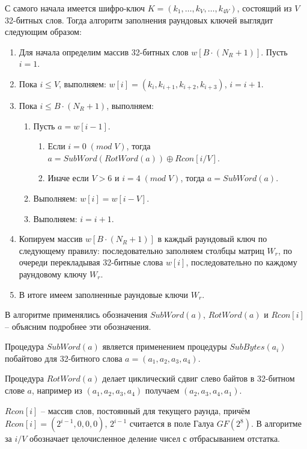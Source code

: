    С самого начала имеется шифро-ключ $K = (k_1, \dots, k_{V}, \dots, k_{4V})$, состоящий из $V$ 32-битных слов.
    Тогда алгоритм заполнения раундовых ключей выглядит следующим образом:
    \begin{enumerate}
        \item Для начала определим массив 32-битных слов $w[B \cdot (N_R + 1)]$. Пусть $i = 1$.
        \item Пока $i \leq V$, выполняем: $w[i] = (k_{i}, k_{i + 1}, k_{i + 2}, k_{i + 3})$, $i = i + 1$.
        \item Пока $i \leq B \cdot (N_R + 1)$, выполняем:
        \begin{enumerate}
            \item Пусть $a = w[i - 1]$.

            \begin{enumerate}
                \item Если $i = 0 \; (mod \; V)$, тогда $a = SubWord(RotWord(a)) \oplus Rcon[i / V]$.
                \item Иначе если $V > 6$ и $i = 4 \; (mod \; V)$, тогда $a = SubWord(a)$.
            \end{enumerate}

            \item Выполняем: $w[i] = w[i - V]$.
            \item Выполняем: $i = i + 1$.
        \end{enumerate}

        \item Копируем массив $w[B \cdot (N_R + 1)]$ в каждый раундовый ключ по следующему правилу: последовательно
        заполняем столбцы матриц $W_r$, по очереди перекладывая 32-битные слова $w[i]$, последовательно по каждому
        раундовому ключу $W_r$.
        \item В итоге имеем заполненные раундовые ключи $W_r$.
    \end{enumerate}

    В алгоритме применялись обозначения $SubWord(a)$, $RotWord(a)$ и $Rcon[i]$ -- объясним подробнее эти обозначения.

    Процедура $SubWord(a)$ является применением процедуры $SubBytes(a_{i})$ побайтово для 32-битного слова
    $a = (a_1, a_2, a_3, a_4)$.

    Процедура $RotWord(a)$ делает циклический сдвиг слево байтов в 32-битном слове $a$, например из $(a_1, a_2, a_3, a_4)$
    получаем $(a_2, a_3, a_4, a_1)$.

    $Rcon[i]$ -- массив слов, постоянный для текущего раунда, причём $Rcon[i] = (2^{i-1}, 0, 0, 0)$, $2^{i-1}$ считается
    в поле Галуа $GF(2^8)$. В алгоритме за $i / V$ обозначает целочисленное деление чисел с отбрасыванием отстатка.

